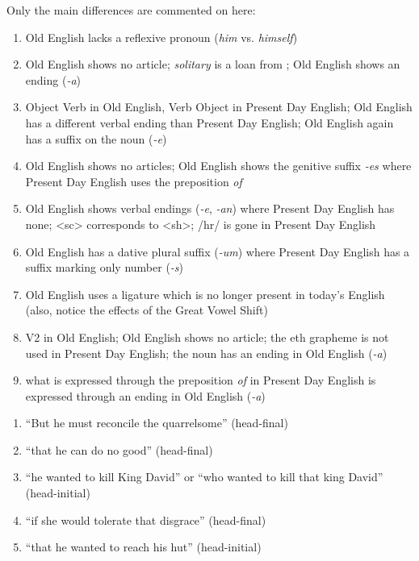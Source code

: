 \noindent Only the main differences are commented on here:
\begin{enumerate}
    \item Old English lacks a reflexive pronoun (\textit{him} vs. \textit{himself})
    \item Old English shows no article; \textit{solitary} is a loan from ; Old English shows an ending (\textit{-a})
    \item Object Verb in Old English, Verb Object in Present Day English; Old English has a different verbal ending than Present Day English; Old English again has a suffix on the noun (\textit{-e})
    \item Old English shows no articles; Old English shows the genitive suffix \textit{-es} where Present Day English uses the preposition \textit{of}
    \item Old English shows verbal endings (\textit{-e}, \textit{-an}) where Present Day English has none; <sc> corresponds to <sh>; /hr/ is gone in Present Day English
    \item Old English has a dative plural suffix (\textit{-um}) where Present Day English has a suffix marking only number (\textit{-s})
    \item Old English uses a ligature which is no longer present in today's English (also, notice the effects of the Great Vowel Shift)
    \item V2 in Old English; Old English shows no article; the eth grapheme is not used in Present Day English; the noun has an ending in Old English (\textit{-a})
    \item what is expressed through the preposition \textit{of} in Present Day English is expressed through an ending in Old English (\textit{-a})
\end{enumerate}


\noindent\textbf{}
\begin{enumerate}
    \item ``But he must reconcile the quarrelsome'' (head-final)
    \item ``that he can do no good'' (head-final)
    \item ``he wanted to kill King David'' or ``who wanted to kill that king David'' (head-initial)
    \item ``if she would tolerate that disgrace'' (head-final)
    \item ``that he wanted to reach his hut'' (head-initial)
\end{enumerate}


